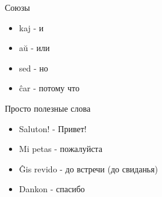 \documentclass[ignorenonframetext,hyperref={pdftex,unicode}]{beamer}
\begin{document}
\begin{frame}{Союзы}
    \begin{itemize}
        \item kaj - и
        \item aŭ - или
        \item sed - но
        \item ĉar - потому что
    \end{itemize}
\end{frame}

\begin{frame}{Просто полезные слова}
    \begin{itemize}
        \item Saluton! - Привет!
        \item Mi petas - пожалуйста
        \item Ĝis revido - до встречи (до свиданья)
        \item Dankon - спасибо
    \end{itemize}
\end{frame}
 
\end{document}
